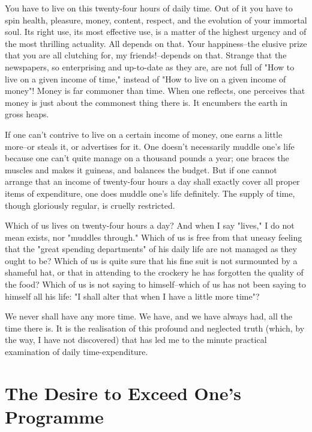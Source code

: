 You have to live on this twenty-four hours of daily time.  Out of it
you have to spin health, pleasure, money, content, respect, and the
evolution of your immortal soul.  Its right use, its most effective
use, is a matter of the highest urgency and of the most thrilling
actuality.  All depends on that.  Your happiness--the elusive prize
that you are all clutching for, my friends!--depends on that. Strange
that the newspapers, so enterprising and up-to-date as they are, are
not full of "How to live on a given income of time," instead of "How to
live on a given income of money"!  Money is far commoner than time.
When one reflects, one perceives that money is just about the commonest
thing there is.  It encumbers the earth in gross heaps.

If one can't contrive to live on a certain income of money, one earns a
little more--or steals it, or advertises for it.  One doesn't
necessarily muddle one's life because one can't quite manage on a
thousand pounds a year; one braces the muscles and makes it guineas,
and balances the budget.  But if one cannot arrange that an income of
twenty-four hours a day shall exactly cover all proper items of
expenditure, one does muddle one's life definitely.  The supply of
time, though gloriously regular, is cruelly restricted.


Which of us lives on twenty-four hours a day?  And when I say "lives,"
I do not mean exists, nor "muddles through."  Which of us is free from
that uneasy feeling that the "great spending departments" of his daily
life are not managed as they ought to be? Which of us is quite sure
that his fine suit is not surmounted by a shameful hat, or that in
attending to the crockery he has forgotten the quality of the food?
Which of us is not saying to himself--which of us has not been saying
to himself all his life:  "I shall alter that when I have a little more
time"?

We never shall have any more time.  We have, and we have always had,
all the time there is.  It is the realisation of this profound and
neglected truth (which, by the way, I have not discovered) that has led
me to the minute practical examination of daily time-expenditure.



\addtocounter{chapter}{1}\chapter*{The Desire to Exceed One's Programme}

